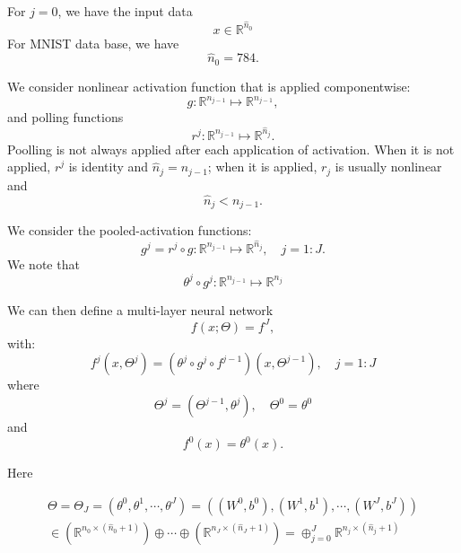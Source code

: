 For $j=0$, we have the input data
$$
x\in \mathbb R^{\hat n_{0}}
$$
For MNIST data base, we have
$$
\hat n_0 = 784.
$$

We consider nonlinear activation function that is applied componentwise:
\begin{equation}\label{DNN_iteration_vector}
g:\mathbb R^{ n_{j-1}}\mapsto \mathbb R^{n_{j-1}},
\end{equation}
and polling functions
\begin{equation}\label{DNN_iteration_vector}
r^j:\mathbb R^{ n_{j-1}}\mapsto \mathbb R^{\hat n_{j}}.
\end{equation}
Poolling is not always applied after each application of activation.
When it is not applied, $r^j$ is identity and $\hat n_j=n_{j-1}$;   when
it is applied, $r_j$ is usually nonlinear and
$$
\hat n_j<n_{j-1}.
$$

We consider the pooled-activation functions:
\begin{equation}\label{DNN_iteration_vector}
g^j=r^j\circ g: \mathbb R^{{n}_{j-1}}\mapsto
\mathbb R^{\hat n_{j}}, \quad j =  1 :J.
\end{equation}
We note that
\begin{equation}
\theta^j\circ g^j:    \mathbb R^{{n}_{j-1}}\mapsto
\mathbb R^{n_{j}}
\end{equation}

We can then define a multi-layer neural network
	\begin{equation}\label{DNN_finallayer}
	f(x; \Theta) = f^J,
	\end{equation}
        with:
	\begin{equation}\label{DNN_iteration_vector}
	f^j(x,\Theta^j) = (\theta^j\circ g^j\circ
        f^{j-1})(x,\Theta^{j-1}), \quad j=1:J
	\end{equation}
where
\begin{equation}
\Theta^j=(\Theta^{j-1},\theta^j), \quad \Theta^0=\theta^0
\end{equation}
and
	\begin{equation}
	f^0(x)=\theta^0(x).
	\end{equation}

Here

\begin{align}
\Theta =\Theta_J =(\theta^0,\theta^1, \cdots, \theta^J)=( ({W^0}, {b^0}),({W^1}, {b^1}),
\cdots, ({W^J}, {b^J})) \\
\displaystyle
	\in  (\mathbb{R}^{n_0 \times (\hat n_0 + 1)}) \oplus \cdots
        \oplus  	(\mathbb{R}^{{n}_{J} \times (\hat
          n_{J}+1)})=
\oplus_{j=0}^J \mathbb{R}^{n_{j} \times (\hat n_{j} + 1)}
\end{align}




